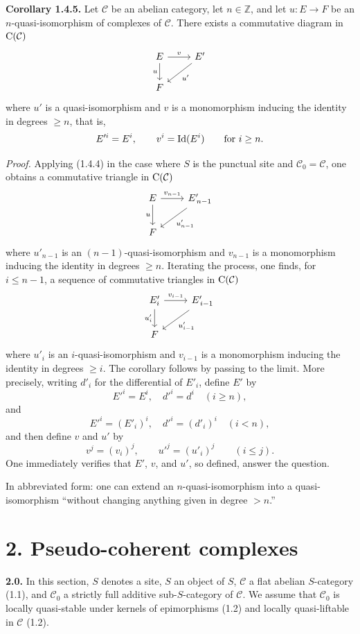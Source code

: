 \documentclass[11pt]{article}
\begin{document}
\textbf{Corollary 1.4.5.} Let \(\mathcal C\) be an abelian category, let \(n\in\mathbb Z\), and let \(u:E\to F\) be an \(n\)-quasi-isomorphism of complexes of \(\mathcal C\). There exists a commutative diagram in \(\mathrm C(\mathcal C)\)
\[
\begin{tikzcd}
E \arrow[r,"v"] \arrow[d,"u"'] & E' \arrow[dl,"u'"]\\
F &
\end{tikzcd}
\]
where \(u'\) is a quasi-isomorphism and \(v\) is a monomorphism inducing the identity in degrees \(\geq n\), that is,
\[
  E'^i=E^i,\qquad v^i=\operatorname{Id}(E^i)\qquad\text{for }i\geq n.
\]

\emph{Proof.} Applying (1.4.4) in the case where \(S\) is the punctual site and \(\mathcal C_0=\mathcal C\), one obtains a commutative triangle in \(\mathrm C(\mathcal C)\)
\[
\begin{tikzcd}
E \arrow[r,"v_{n-1}"] \arrow[d,"u"'] & E'_{\,n-1} \arrow[dl,"u'_{n-1}"]\\
F &
\end{tikzcd}
\]
where \(u'_{n-1}\) is an \((n-1)\)-quasi-isomorphism and \(v_{n-1}\) is a monomorphism inducing the identity in degrees \(\geq n\). Iterating the process, one finds, for \(i\leq n-1\), a sequence of commutative triangles in \(\mathrm C(\mathcal C)\)
\[
\begin{tikzcd}
E'_i \arrow[r,"v_{i-1}"] \arrow[d,"u'_i"'] & E'_{\,i-1} \arrow[dl,"u'_{i-1}"]\\
F &
\end{tikzcd}
\]
where \(u'_i\) is an \(i\)-quasi-isomorphism and \(v_{i-1}\) is a monomorphism inducing the identity in degrees \(\geq i\). The corollary follows by passing to the limit. More precisely, writing \(d'_i\) for the differential of \(E'_i\), define \(E'\) by
\[
  E'^i=E^i,\quad d'^i=d^i\quad (i\geq n),
\]
and
\[
  E'^i=(E'_i)^i,\quad d'^i=(d'_i)^i\quad (i<n),
\]
and then define \(v\) and \(u'\) by
\[
  v^j=(v_i)^j,\qquad u'^j=(u'_i)^j\qquad (i\leq j).
\]
One immediately verifies that \(E'\), \(v\), and \(u'\), so defined, answer the question.

In abbreviated form: one can extend an \(n\)-quasi-isomorphism into a quasi-isomorphism ``without changing anything given in degree \(>n\).''

\section*{2. Pseudo-coherent complexes}

\textbf{2.0.} In this section, \(S\) denotes a site, \(S\) an object of \(S\), \(\mathcal C\) a flat abelian \(S\)-category (1.1), and \(\mathcal C_0\) a strictly full additive sub-\(S\)-category of \(\mathcal C\). We assume that \(\mathcal C_0\) is locally quasi-stable under kernels of epimorphisms (1.2) and locally quasi-liftable in \(\mathcal C\) (1.2).
\end{document}
